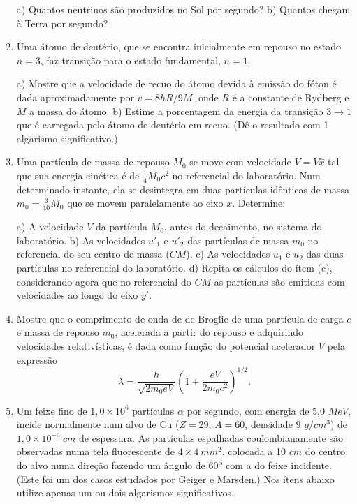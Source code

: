 \begin{enumerate}[start=1,label={\bfseries Q\arabic*.}]
  a) Quantos neutrinos são produzidos no Sol por segundo?
  b) Quantos chegam à Terra por segundo?



\item Uma átomo de deutério, que se encontra inicialmente em repouso no estado $n=3$, faz transição para o estado fundamental, $n=1$.

  a) Mostre que a velocidade de recuo do átomo devida à emissão do fóton é dada aproximadamente por $v = 8hR/9M$, onde $R$ é a constante de Rydberg e $M$ a massa do átomo.
  b) Estime a porcentagem da energia da transição $3 \rightarrow 1$ que é carregada pelo átomo de deutério em recuo. (Dê o resultado com 1 algarismo significativo.)



\item Uma partícula de massa de repouso $M_{0}$ se move com velocidade $V = V \hat{x} $ tal que sua energia cinética é de $\frac{1}{4} M_{0} c^{2}$ no referencial do laboratório. Num determinado instante, ela se desintegra em duas partículas idênticas de massa $m_{0} = \frac{3}{10}M_{0}$ que se movem paralelamente ao eixo $x$. Determine:

a) A velocidade $V$ da partícula $M_{0}$, antes do decaimento, no sistema do laboratório.
b) As velocidades $u'_{1}$ e $u'_{2}$ das partículas de massa $m_{0}$ no referencial do seu centro de massa ($CM$).
c) As velocidades $u_{1}$ e $u_{2}$ das duas partículas no referencial do laboratório.
d) Repita os cálculos do ítem (c), considerando agora que no referencial do $CM$ as partículas são emitidas com velocidades ao longo do eixo $y'$.



\item Mostre que o comprimento de onda de de Broglie de uma partícula de carga $e$ e massa de repouso $m_{0}$, acelerada a partir do repouso e adquirindo velocidades relativísticas, é dada como função do potencial acelerador $V$ pela expressão
$$
\lambda = \frac{h}{\sqrt{2m_{0} eV}} \left( 1 + \frac{eV}{2m_{0}c^{2}}   \right)^{1/2}.
$$



\item Um feixe fino de $1,0 \times 10^{6}$ partículas $\alpha$ por segundo, com energia de 5,0 $MeV$, incide normalmente num alvo de Cu ($Z = 29$, $A = 60$, densidade 9 $g/cm^{3}$) de $1,0 \times 10^{-4} \ cm$ de espessura. As partículas espalhadas coulombianamente são observadas numa tela fluorescente de $4 \times 4 \ mm^{2}$, colocada a 10 $cm$ do centro do alvo numa direção fazendo um ângulo de $60º$ com a do feixe incidente. (Este foi um dos casos estudados por Geiger e Marsden.) Nos ítens abaixo utilize apenas um ou dois algarismos significativos.


\end{enumerate}
